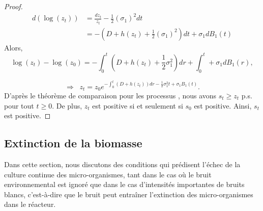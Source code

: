 \documentclass[12pt,a4paper]{report}%
\begin{document}
\begin{proof}
	\[
	\begin{aligned}
		d(\log(z_t)) &= \frac{dz_t}{z_t} - \frac{1}{2}(\sigma_1)^2 dt\\
		&=-\left( D+h(z_t)+\frac{1}{2}(\sigma_1)^2\right) d t +\sigma_1dB_1(t)
	\end{aligned}
	\]
	Alors,
	\[
	\log(z_t) - \log(z_0) = -\int_0^t \left( D+h(z_t)+\frac{1}{2}\sigma_1^2\right)dr + \int_0^t  +\sigma_1dB_1(r),
	\]
	
	\[
	\Rightarrow \;\; z_t = z_0 e^{-\int_0^t (D+h(z_t)) dr-\frac{1}{2}\sigma_1^2t  + \sigma_1 B_1(t)}.
	\]
	D'après le théorème de comparaison pour les processus \cite{art2}, nous avons \(s_t \geqslant z_t\) p.s. pour tout \(t \geq 0\). De plus, \(z_t\) est positive si et seulement si \(s_0\) est positive. Ainsi, \(s_t\) est positive.
	
\end{proof}
\subsection{Extinction de la biomasse}
Dans cette section, nous discutons des conditions qui prédisent l'échec de la culture continue des micro-organismes, tant dans le cas où le bruit environnemental est ignoré que dans le cas d'intensités importantes de bruits blancs, c'est-à-dire que le bruit peut entraîner l'extinction des micro-organismes dans le réacteur.
\end{document}
